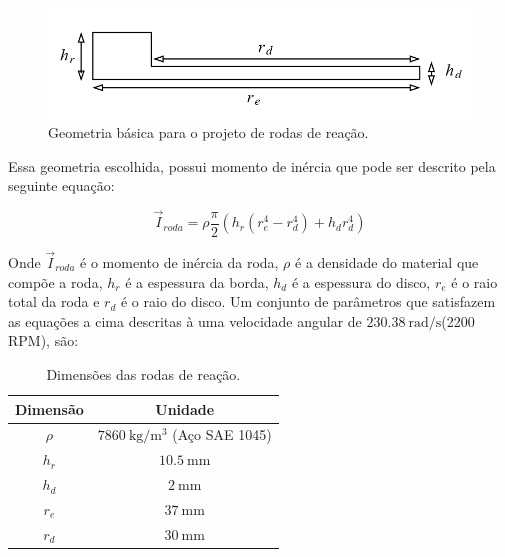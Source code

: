 \begin{figure}[H]
  \caption{Geometria básica para o projeto de rodas de reação.}
  \begin{center}
      \includegraphics[scale=.45]{metodologia/img/roda_reacao_modelo}
  \end{center}
  \label{fig:motor_roda_desenho2}
\end{figure}

Essa geometria escolhida, possui momento de inércia que pode ser descrito pela seguinte equação:

\begin{equation}
\vec{I}_{roda} = \rho \frac{\pi}{2}(h_r(r_{e}^4-r_d^4)+h_dr_d^4) 
\end{equation}

Onde $\vec{I}_{roda}$ é o momento de inércia da roda, $\rho$ é a densidade do material que compõe a roda, $h_r$ é a espessura da borda, $h_d$ é a espessura do disco, $r_e$ é o raio total da roda e $r_d$ é o raio do disco. Um conjunto de parâmetros que satisfazem as equações a cima descritas à uma velocidade angular de $\SI{230.38}{\radian\per\second}$(2200 RPM), são: 

\begin{table}
  \caption{Dimensões das rodas de reação.}
  \label{tab:bias_correction}
  \centering%
  \begin{minipage}{.42\textwidth}
    \begin{tabular*}{\textwidth}{cc}
      \hline
      {Dimensão} & Unidade \\ \hline
      \hline
      $\rho$  &  $\SI{7860}{\kilogram\per\cubic\metre}$ (Aço SAE 1045)\\ 
      $h_r$   &  $\SI{10.5}{\milli\metre}$ \\
      $h_d$   &  $\SI{2}{\milli\metre}$  \\
      $r_e$   &  $\SI{37}{\milli\metre}$  \\
      $r_d$   &  $\SI{30}{\milli\metre}$  \\ \hline
    \end{tabular*}
  \end{minipage}
\end{table}


